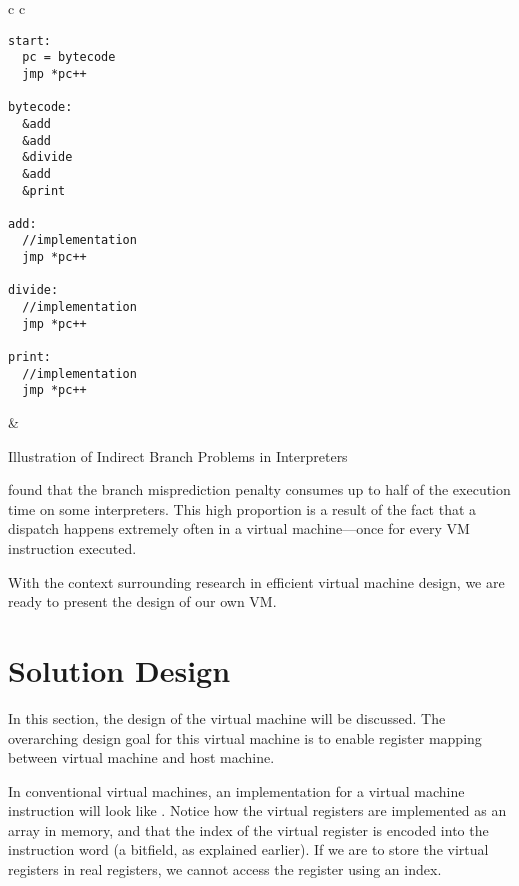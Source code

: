 		\begin{myfigure}
			\begin{tabular}{c c}
				{
				\begin{lstlisting}
start:
  pc = bytecode
  jmp *pc++

bytecode:
  &add
  &add
  &divide
  &add
  &print

add:
  //implementation
  jmp *pc++

divide:
  //implementation
  jmp *pc++

print:
  //implementation
  jmp *pc++
				\end{lstlisting}
			} & 
			{
				\hspace{-9em}
			}
			\end{tabular}
			\caption{Illustration of Indirect Branch Problems in Interpreters}
			\label{fig:interpreterbtb}
		\end{myfigure}
		
		\cite{structureinterpreters} found that the branch misprediction penalty consumes up to half of the execution time on some interpreters. This high proportion is a result of the fact that a dispatch happens extremely often in a virtual machine---once for every VM instruction executed.
		
		With the context surrounding research in efficient virtual machine design, we are ready to present the design of our own VM.
		
\chapter{Solution Design}
	In this section, the design of the virtual machine will be discussed. The overarching design goal for this virtual machine is to enable register mapping between virtual machine and host machine.
	
	In conventional virtual machines, an implementation for a virtual machine instruction will look like . Notice how the virtual registers are implemented as an array in memory, and that the index of the virtual register is encoded into the instruction word (a bitfield, as explained earlier). If we are to store the virtual registers in real registers, we cannot access the register using an index.
	
